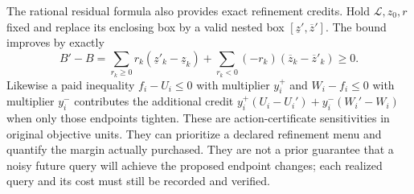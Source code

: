 The rational residual formula also provides exact refinement credits.
Hold $\mathcal L,z_0,r$ fixed and replace its enclosing box by a
valid nested box $[\underline z',\overline z']$. The bound improves by
exactly
\begin{equation}\label{eq:refinementcredit124}
 B'-B=\sum_{r_k\ge0}r_k(\underline z'_k-\underline z_k)
        +\sum_{r_k<0}(-r_k)(\overline z_k-\overline z'_k)\ge0.
\end{equation}
Likewise a paid inequality $f_i-U_i\le0$ with multiplier $y_i^+$
and $W_i-f_i\le0$ with multiplier $y_i^-$ contributes the additional
credit
$y_i^+(U_i-U_i')+y_i^-(W_i'-W_i)$ when only those endpoints tighten.
These are action-certificate sensitivities in original objective units.
They can prioritize a declared refinement menu and quantify the margin
actually purchased. They are not a prior guarantee that a noisy future
query will achieve the proposed endpoint changes; each realized query
and its cost must still be recorded and verified.

